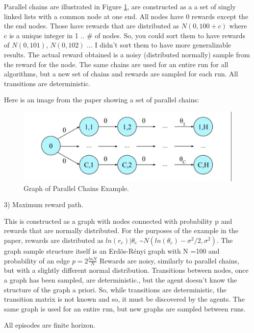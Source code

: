 \documentclass{article}
\begin{document}
Parallel chains are illustrated in Figure \ref{fig:parallelchains}, are constructed as a a set of singly linked lists with a common node at one end. All nodes have 0 rewards except the the end nodes. Those have  rewards that are distributed as $N(0,100+c)$ where c is a unique integer in 1 .. \# of nodes. So, you could sort them to have rewards of $N(0,101)$, $N(0,102)$ ... I didn't sort them to have more generalizable results. The actual reward obtained is a noisy (distributed normally) sample from the reward for the node.  The same chains are used for an entire run for all algorithms, but a new set of chains and rewards are sampled for each run. All transitions are deterministic.

Here is an image from the paper showing a set of parallel chains:

\begin{figure}[htbp!]
  \centering
\includegraphics[scale=.25]{parallelchains.png}

  \caption{Graph of Parallel Chains Example.}
 \label{fig:parallelchains}
\end{figure}
3) Maximum reward path. 

This is constructed as a graph with nodes connected with probability p and rewards that are normally distributed. For the purposes of the example in the paper, rewards are distributed as $ln{(r_e)} | \theta_e$  \textasciitilde $N(ln{(\theta_e)} - \sigma^2/2,\sigma^2)$. The graph sample structure itself is an Erd\~os-R\'enyi graph with N =100 and probability of an edge $p=2 \frac{ln N}{N}$ Rewards are noisy, similarly to parallel chains, but with a slightly different normal distribution. Transitions between nodes, once a graph has been sampled, are deterministic., but the agent doesn't know the structure of the graph a priori. So, while transitions are deterministic, the transition matrix is not known and so, it must be discovered by the agents. The same graph is used for an entire run, but new graphs are sampled between runs.

All episodes are finite horizon.
\end{document}
